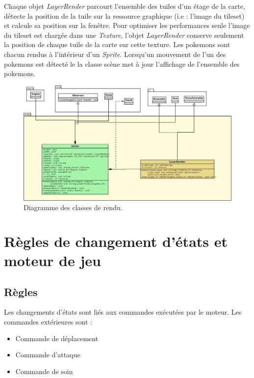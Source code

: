\documentclass[a4paper,12pt]{article}
\begin{document}
Chaque objet \emph{LayerRender} parcourt l'ensemble des tuiles d'un étage de la carte, détecte la position de la tuile sur la ressource graphique (i.e : l'image du tileset) et calcule sa position sur la fenêtre. Pour optimiser les performances seule l'image du tileset est chargée dans une \emph{Texture}, l'objet \emph{LayerRender} conserve seulement la position de chaque tuile de la carte sur cette texture.
Les pokemons sont chacun rendus à l'intérieur d'un \emph{Sprite}.
Lorsqu'un mouvement de l'un des pokemons est détecté le la classe scène met à jour l'affichage de l'ensemble des pokemons.

    \begin{landscape}
    \begin{figure}[p]
    \includegraphics[width=0.9\paperheight]{render.png}
    \caption{\label{uml:render}Diagramme des classes de rendu.}
    \end{figure}
    \end{landscape}

    \clearpage
    \section{Règles de changement d'états et moteur de jeu}

    \subsection{Règles}
    
    Les changements d'états sont liés aux commandes exécutées par le moteur.
    Les commandes extérieures sont : 
    \begin{itemize}
        \item Commande de déplacement
        \item Commande d'attaque
        \item Commande de soin
    \end{itemize}
    
\end{document}
